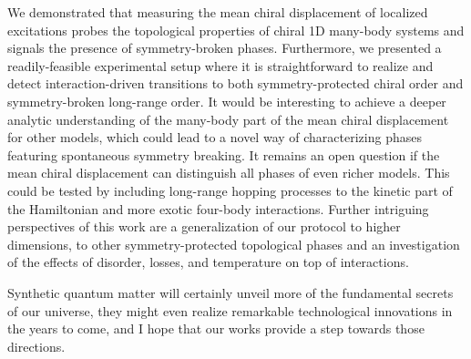 We demonstrated that measuring the mean chiral displacement of localized excitations probes the topological properties of chiral 1D many-body systems and signals the presence of symmetry-broken phases.
Furthermore, we presented a readily-feasible experimental setup where it is straightforward to realize and detect interaction-driven transitions to both symmetry-protected chiral order and symmetry-broken long-range order.
It would be interesting to achieve a deeper analytic understanding of the many-body part of the mean chiral displacement for other models, which could lead to a novel way of characterizing phases featuring spontaneous symmetry breaking.
It remains an open question if the mean chiral displacement can distinguish all phases of even richer models.
This could be tested by including long-range hopping processes to the kinetic part of the Hamiltonian and more exotic four-body interactions.
Further intriguing perspectives of this work are a generalization of our protocol to higher dimensions, to other symmetry-protected topological phases and an investigation of the effects of disorder, losses, and temperature on top of interactions.

Synthetic quantum matter will certainly unveil more of the fundamental secrets of our universe, they might even realize remarkable technological innovations in the years to come, and I hope that our works provide a step towards those directions.
